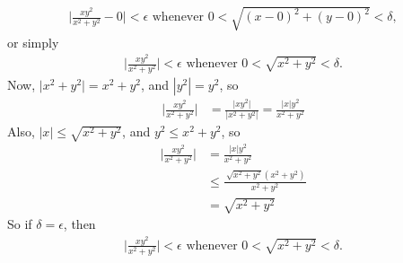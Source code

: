 \documentclass{article}
\begin{document}
\begin{enumerate}
\begin{align*}
 \Big|  \frac{xy^2}{x^2+y^2} - 0 \Big| < \epsilon \text{  whenever  } 0 < \sqrt{(x-0)^2 + (y-0)^2} < \delta ,
\end{align*}
or simply
\begin{align*}
 \Big|  \frac{xy^2}{x^2+y^2} \Big| < \epsilon \text{  whenever  } 0 < \sqrt{x^2 + y^2} < \delta .
\end{align*}
Now, $\big| x^2 + y^2\big| = x^2 + y^2$, and $|y^2| = y^2$, so
\begin{align*}
 \Big|  \frac{xy^2}{x^2+y^2} \Big| &=  \frac{ \big|xy^2 \big|}{ \big|x^2+y^2 \big|}  =   \frac{ \big|x\big|y^2 }{ x^2+y^2 }
\end{align*}
Also, $|x| \le \sqrt{x^2+y^2}$, and $y^2 \le x^2+y^2$, so
\begin{align*}
 \Big|  \frac{xy^2}{x^2+y^2} \Big| 
 &=  \frac{ \big|x\big|y^2 }{ x^2+y^2 }\\
 &\le \frac{ \ \sqrt{x^2+y^2} ( x^2+y^2 ) }{ x^2+y^2 }\\
 &= \sqrt{x^2+y^2}
\end{align*}
So if $\delta = \epsilon$, then 
\begin{align*}
 \Big|  \frac{xy^2}{x^2+y^2} \Big| < \epsilon \text{  whenever  } 0 < \sqrt{x^2 + y^2} < \delta .
\end{align*}

\end{enumerate}
\end{document}
